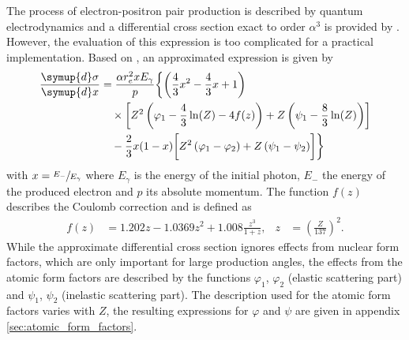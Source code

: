 The process of electron-positron pair production is described by quantum electrodynamics and a differential cross section exact to order $\alpha^3$ is provided by \cite{RevModPhys.46.815}.
However, the evaluation of this expression is too complicated for a practical implementation.
Based on \cite[][Eq.~3.9]{RevModPhys.46.815}, an approximated expression is given by
%
\begin{equation}
	\label{eqn:crosssection_pairproduction}
	\begin{split}
	\frac{\symup{d}\sigma}{\symup{d}x} &= \frac{\alpha r_e^2 x E_{\gamma}}{p} \biggl\{ \left(\frac{4}{3} x^2 - \frac{4}{3} x + 1 \right) \\ &\quad\times \biggl[ Z^2 \left(\varphi_1 - \frac{4}{3} \ln(Z) - 4f(z) \right) + Z \left( \psi_1 - \frac{8}{3} \ln(Z) \right) \biggr]  \\ &\quad- \frac{2}{3} x (1 - x) \biggl[ Z^2 \left(\varphi_1 - \varphi_2\right) + Z \left(\psi_1 - \psi_2\right) \biggr] \biggr\}
	\end{split}
\end{equation}
%
with $x = \sfrac{E_{-}}{E_{\gamma}}$ where $E_{\gamma}$ is the energy of the initial photon, $E_-$ the energy of the produced electron and $p$ its absolute momentum.
The function $f(z)$ describes the Coulomb correction and is defined as
%
\begin{align}
	f(z) &= 1.202 z - 1.0369 z^2 + 1.008 \frac{z^3}{1+z}, & z &= \left(\frac{Z}{137}\right)^2.
\end{align}
%
While the approximate differential cross section ignores effects from nuclear form factors, which are only important for large production angles, the effects from the atomic form factors are described by the functions $\varphi_1$, $\varphi_2$ (elastic scattering part) and $\psi_1$, $\psi_2$ (inelastic scattering part).
The description used for the atomic form factors varies with $Z$, the resulting expressions for $\varphi$ and $\psi$ are given in appendix \ref{sec:atomic_form_factors}.

